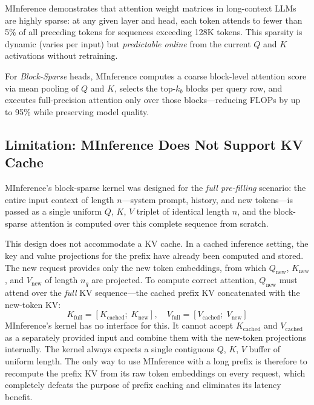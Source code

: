 \documentclass{article}
\begin{document}
MInference \cite{minference} demonstrates that attention weight matrices
in long-context LLMs are highly sparse: at any given layer and head, each
token attends to fewer than 5\% of all preceding tokens for sequences
exceeding 128K tokens. This sparsity is dynamic (varies per input) but
\textit{predictable online} from the current $Q$ and $K$ activations
without retraining.

For \textit{Block-Sparse} heads, MInference computes a coarse block-level
attention score via mean pooling of $Q$ and $K$, selects the top-$k_b$
blocks per query row, and executes full-precision attention only over those
blocks---reducing FLOPs by up to 95\% while preserving model quality.

\subsection{Limitation: MInference Does Not Support KV Cache}
\label{sec:limitation}

MInference's block-sparse kernel was designed for the \textit{full
pre-filling} scenario: the entire input context of length $n$---system
prompt, history, and new tokens---is passed as a single uniform $Q$, $K$,
$V$ triplet of identical length $n$, and the block-sparse attention is
computed over this complete sequence from scratch.

This design does not accommodate a KV cache. In a cached inference
setting, the key and value projections for the prefix have already been
computed and stored. The new request provides only the new token
embeddings, from which $Q_{\text{new}}$, $K_{\text{new}}$, and
$V_{\text{new}}$ of length $n_q$ are projected. To compute correct
attention, $Q_{\text{new}}$ must attend over the \textit{full} KV
sequence---the cached prefix KV concatenated with the new-token KV:
%
\begin{equation}
  K_{\text{full}} = [K_{\text{cached}};\; K_{\text{new}}], \quad
  V_{\text{full}} = [V_{\text{cached}};\; V_{\text{new}}]
  \label{eq:kv-concat}
\end{equation}
%
MInference's kernel has no interface for this. It cannot accept
$K_{\text{cached}}$ and $V_{\text{cached}}$ as a separately provided input
and combine them with the new-token projections internally. The kernel
always expects a single contiguous $Q$, $K$, $V$ buffer of uniform length.
The only way to use MInference with a long prefix is therefore to
recompute the prefix KV from its raw token embeddings on every request,
which completely defeats the purpose of prefix caching and eliminates its
latency benefit.
\end{document}
